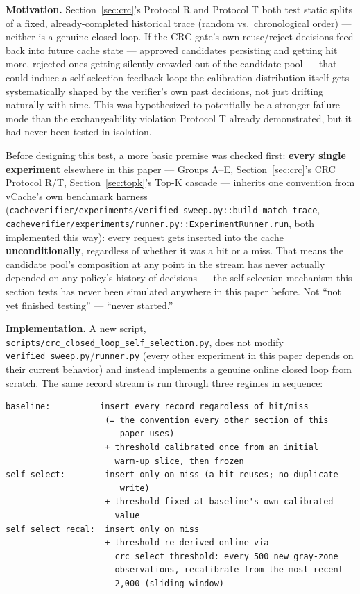 \documentclass[11pt]{article}
\begin{document}
\textbf{Motivation.} Section~\ref{sec:crc}'s Protocol R and Protocol T both test static splits of a fixed, already-completed historical trace (random vs.\ chronological order) --- neither is a genuine closed loop. If the CRC gate's own reuse/reject decisions feed back into future cache state --- approved candidates persisting and getting hit more, rejected ones getting silently crowded out of the candidate pool --- that could induce a self-selection feedback loop: the calibration distribution itself gets systematically shaped by the verifier's own past decisions, not just drifting naturally with time. This was hypothesized to potentially be a stronger failure mode than the exchangeability violation Protocol T already demonstrated, but it had never been tested in isolation.

Before designing this test, a more basic premise was checked first: \textbf{every single experiment} elsewhere in this paper --- Groups A--E, Section~\ref{sec:crc}'s CRC Protocol R/T, Section~\ref{sec:topk}'s Top-K cascade --- inherits one convention from vCache's own benchmark harness (\texttt{cacheverifier/\allowbreak{}experiments/\allowbreak{}verified\_\allowbreak{}sweep.\allowbreak{}py:\allowbreak{}:\allowbreak{}build\_\allowbreak{}match\_\allowbreak{}trace}, \texttt{cacheverifier/\allowbreak{}experiments/\allowbreak{}runner.\allowbreak{}py:\allowbreak{}:\allowbreak{}Experiment\allowbreak{}Runner.\allowbreak{}run}, both implemented this way): every request gets inserted into the cache \textbf{unconditionally}, regardless of whether it was a hit or a miss. That means the candidate pool's composition at any point in the stream has never actually depended on any policy's history of decisions --- the self-selection mechanism this section tests has never been simulated anywhere in this paper before. Not ``not yet finished testing'' --- ``never started.''

\textbf{Implementation.} A new script, \texttt{scripts/\allowbreak{}crc\_\allowbreak{}closed\_\allowbreak{}loop\_\allowbreak{}self\_\allowbreak{}selection.\allowbreak{}py}, does not modify \texttt{verified\_\allowbreak{}sweep.\allowbreak{}py}/\texttt{runner.\allowbreak{}py} (every other experiment in this paper depends on their current behavior) and instead implements a genuine online closed loop from scratch. The same record stream is run through three regimes in sequence:

\begin{verbatim}
baseline:          insert every record regardless of hit/miss
                    (= the convention every other section of this
                       paper uses)
                    + threshold calibrated once from an initial
                      warm-up slice, then frozen
self_select:        insert only on miss (a hit reuses; no duplicate
                       write)
                    + threshold fixed at baseline's own calibrated
                      value
self_select_recal:  insert only on miss
                    + threshold re-derived online via
                      crc_select_threshold: every 500 new gray-zone
                      observations, recalibrate from the most recent
                      2,000 (sliding window)
\end{verbatim}
\end{document}
